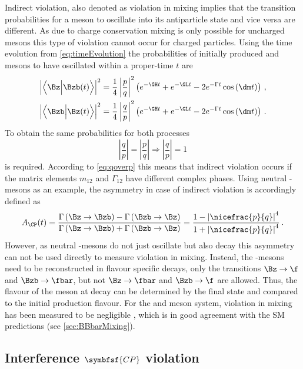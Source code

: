 Indirect \CP violation, also denoted as \CP violation in mixing implies that the transition probabilities for a meson \Paz to oscillate into its antiparticle state \Pazb and vice versa are different.
As due to charge conservation mixing is only possible for uncharged mesons this type of \CP violation cannot occur for charged particles.
Using the time evolution from \cref{eq:timeEvolution} the probabilities of \eg initially produced \Bz and \Bzb mesons to have oscillated within a proper-time $t$ are
\begin{align}
\left|\left<\Bz\Big|\Bzb\!\left(t\right)\right>\right|^2=\frac{1}{4}\left|\frac{p}{q}\right|^2
\left(e^{-\GH t}+e^{-\GL t}-2e^{-\Gamma t}\cos\left(\dm t\right)\right)\,,\\
\left|\left<\Bzb\Big|\Bz\!\left(t\right)\right>\right|^2=\frac{1}{4}\left|\frac{q}{p}\right|^2
\left(e^{-\GH t}+e^{-\GL t}-2e^{-\Gamma t}\cos\left(\dm t\right)\right)\,.
\end{align}
To obtain the same probabilities for both processes
\begin{equation}
\left|\frac{q}{p}\right|=\left|\frac{p}{q}\right| \Rightarrow \left|\frac{q}{p}\right|=1
\end{equation}
is required.
According to \cref{eq:qoverp} this means that indirect \CP violation occurs if the matrix elements $m_{12}$ and $\Gamma_{12}$ have different complex phases.
Using neutral \B-mesons as an example, the \CP asymmetry in case of indirect \CP violation is accordingly defined as
\begin{equation}
A_{\CP}(t)=\frac{\Gamma\left(\Bz\to\Bzb\right) - \Gamma\left(\Bzb\to\Bz\right)}{\Gamma\left(\Bz\to\Bzb\right) + \Gamma\left(\Bzb\to\Bz\right)}
= \frac{1-\left|\nicefrac{p}{q}\right|^4}{1+\left|\nicefrac{p}{q}\right|^4}\,.
\end{equation}
However, as neutral \B-mesons do not just oscillate but also decay this asymmetry can not be used directly to measure \CP violation in mixing.
Instead, the \B-mesons need to be reconstructed in flavour specific decays, \ie only the transitions $\Bz\to\f$ and $\Bzb\to\fbar$, but not $\Bz\to\fbar$ and $\Bzb\to\f$ are allowed.
Thus, the flavour of the meson at decay can be determined by the final state and compared to the initial production flavour.
For the \Bz and \Bs meson system, \CP violation in mixing has been measured to be negligible \cite{HFLAV2016}, which is in good agreement with the \ac{SM} predictions (see \cref{sec:BBbarMixing}).

\subsection[head={Interference \CP violation},tocentry={Interference \CP violation}]{Interference $\symbfsf{C{}P}$ violation}
\label{sec:InterferenceCPV}

